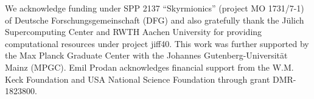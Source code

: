 \documentclass[
    aps,
    prl,
    twocolumn,
    floatfix,
    superscriptaddress
]{revtex4-2}
\begin{document}

We  acknowledge  funding  under SPP 2137 ``Skyrmionics'' (project  MO  1731/7-1)  of  Deutsche  Forschungsgemeinschaft (DFG) and also gratefully thank the J\"ulich Supercomputing Center and RWTH Aachen University for providing computational resources under project jiff40. 
This work was further supported by the Max Planck Graduate Center with the Johannes Gutenberg-Universit\"at Mainz (MPGC).
Emil Prodan acknowledges financial support from the W.M. Keck Foundation and USA National Science Foundation through grant  DMR-1823800.


\vfill \newpage




\end{document}
